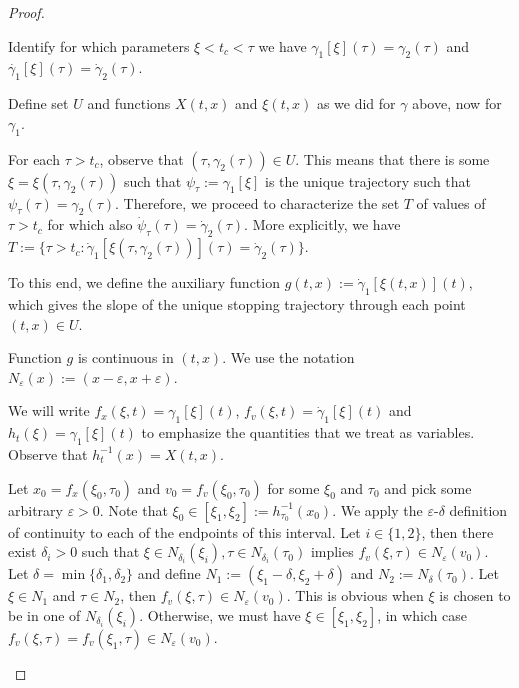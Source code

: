 \documentclass[a4paper]{article}
\theoremstyle{definition}
\theoremstyle{plain}
\begin{document}
\begin{proof}
\begin{outline}
  \1 Identify for which parameters $\xi < t_{c} < \tau$ we have
  $\gamma_{1}[\xi](\tau) = \gamma_{2}(\tau)$ and
  $\dot{\gamma_{1}}[\xi](\tau) = \dot{\gamma}_{2}(\tau)$.

  \2 Define set $U$ and functions $X(t, x)$ and $\xi(t, x)$ as we did for
  $\gamma$ above, now for $\gamma_{1}$.

  \2 For each $\tau > t_{c}$, observe that $(\tau, \gamma_{2}(\tau)) \in U$.
  This means that there is some $\xi = \xi(\tau, \gamma_{2}(\tau))$ such that
  $\psi_{\tau} := \gamma_{1}[\xi]$ is the unique trajectory such that
  $\psi_{\tau}(\tau) = \gamma_{2}(\tau)$.
  Therefore, we proceed to characterize the set $T$ of values of $\tau > t_{c}$
  for which also $\dot{\psi}_{\tau}(\tau) = \dot{\gamma}_{2}(\tau)$. More
  explicitly, we have
  $T := \{ \tau > t_{c} : \dot{\gamma}_{1}[\xi(\tau, \gamma_{2}(\tau))](\tau) = \dot{\gamma}_{2}(\tau) \}$.


  \2 To this end, we define the auxiliary function
  $g(t, x) := \dot{\gamma}_{1}[\xi(t, x)](t)$, which gives the slope of the
  unique stopping trajectory through each point $(t, x) \in U$.

  \1 Function $g$ is continuous in $(t, x)$. We use the notation
  $N_{\varepsilon}(x) := (x - \varepsilon, x + \varepsilon)$.

  \2 We will write $f_{x}(\xi, t) = \gamma_{1}[\xi](t)$,
  $f_{v}(\xi, t) = \dot{\gamma}_{1}[\xi](t)$ and
  $h_{t}(\xi) = \gamma_{1}[\xi](t)$ to emphasize the quantities that we treat as
  variables. Observe that $h_{t}^{-1}(x) = X(t, x)$.

  \2 Let $x_{0} = f_{x}(\xi_{0}, \tau_{0})$ and $v_{0} = f_{v}(\xi_{0}, \tau_{0})$ for
  some $\xi_{0}$ and $\tau_{0}$ and pick some arbitrary $\varepsilon > 0$. Note that
  $\xi_{0} \in [\xi_{1}, \xi_{2}] := h_{\tau_{0}}^{-1}(x_{0})$.
  We apply the $\varepsilon$-$\delta$ definition of continuity to each of the endpoints of this
  interval. Let $i \in \{1, 2\}$, then there exist $\delta_{i} > 0$ such that
  $\xi \in N_{\delta_{i}}(\xi_{i}), \tau \in N_{\delta_{i}}(\tau_{0})$ implies
  $f_{v}(\xi, \tau) \in N_{\varepsilon}(v_{0})$. Let $\delta = \min\{ \delta_{1}, \delta_{2} \}$ and define
  $N_{1} := (\xi_{1} - \delta, \xi_{2} + \delta)$ and $N_{2} := N_{\delta}(\tau_{0})$. Let $\xi \in N_{1}$
  and $\tau \in N_{2}$, then $f_{v}(\xi, \tau) \in N_{\varepsilon}(v_{0})$. This is obvious when $\xi$
  is chosen to be in one of $N_{\delta_{i}}(\xi_{i})$. Otherwise, we must have $\xi \in [\xi_{1}, \xi_{2}]$,
  in which case $f_{v}(\xi, \tau) = f_{v}(\xi_{1}, \tau) \in N_{\varepsilon}(v_{0})$.


\end{outline}
\end{proof}
\end{document}
